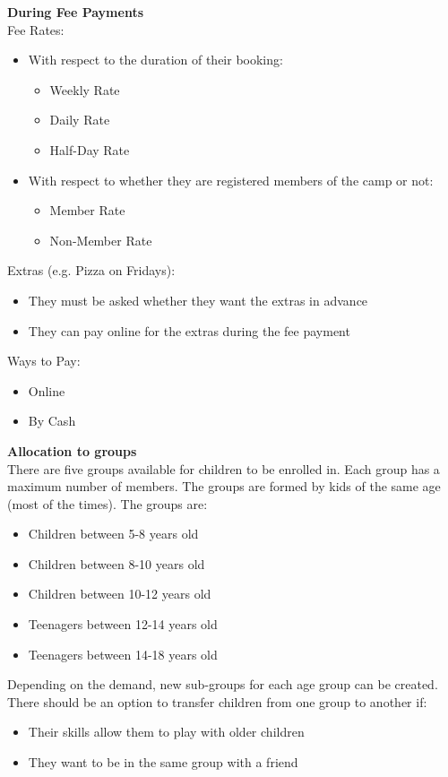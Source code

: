 \documentclass{l3proj}
\begin{document}
\textbf{During Fee Payments}\\
Fee Rates:
	\begin{itemize}
	\item With respect to the duration of their booking:
		\begin{itemize}
		\item Weekly Rate
		\item Daily Rate
		\item Half-Day Rate
		\end{itemize}
	\item With respect to whether they are registered members of the camp or not:
		\begin{itemize}
		\item Member Rate
		\item Non-Member Rate
		\end{itemize}
	\end{itemize}
Extras (e.g. Pizza on Fridays):
	\begin{itemize}
	\item They must be asked whether they want the extras in advance
	\item They can pay online for the extras during the fee payment
	\end{itemize}
Ways to Pay:
	\begin{itemize}
	\item Online
	\item By Cash
	\end{itemize}
\textbf{Allocation to groups}\\
There are five groups available for children to be enrolled in. Each group has a maximum number of members. The groups are formed by kids of the same age (most of the times). The groups are:
\begin{itemize}
	\item Children between 5-8 years old
	\item Children between 8-10 years old
	\item Children between 10-12 years old
	\item Teenagers between 12-14 years old
	\item Teenagers between 14-18 years old
\end{itemize}
Depending on the demand, new sub-groups for each age group can be created. There should be an option to transfer children from one group to another if:
\begin{itemize}
\item Their skills allow them to play with older children
\item They want to be in the same group with a friend
\end{itemize}
\end{document}
